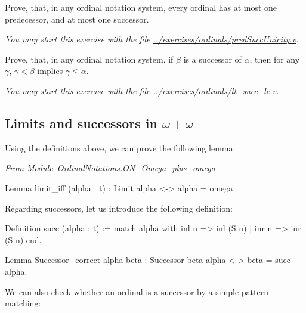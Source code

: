 \begin{exercise}
Prove, that, in any ordinal notation system, every ordinal has at most one predecessor, and at most one successor. 

\emph{You may start this exercise with the file
\url{../exercises/ordinals/predSuccUnicity.v}.}

\end{exercise}

\begin{exercise}
Prove, that, in any ordinal notation system, if $\beta$ is a successor of $\alpha$,
then for any $\gamma$, $\gamma<\beta$ implies 
$\gamma\leq\alpha$.

\emph{You may start this exercise with the file
\url{../exercises/ordinals/lt_succ_le.v}.}
\end{exercise}




\subsection{Limits and successors in \texorpdfstring{$\omega+\omega$}{omega+omega}}

Using the definitions above, we can prove the following lemma:

\vspace{4pt}

\noindent\emph{From Module~\href{../theories/html/hydras.OrdinalNotations.ON_Omega_plus_omega.html}{OrdinalNotations.ON\_Omega\_plus\_omega}}

\begin{Coqsrc}
Lemma limit_iff (alpha : t) : Limit alpha <-> alpha = omega.
\end{Coqsrc}

Regarding successors, let us introduce the following definition:

\begin{Coqsrc}
Definition succ (alpha : t) :=
  match alpha with
    inl n => inl (S n)
  | inr n => inr (S n)
  end.
\end{Coqsrc}


\begin{Coqsrc}
Lemma Successor_correct alpha beta : Successor beta alpha <->
                                     beta = succ alpha.
\end{Coqsrc}

We can also check whether an ordinal is a successor by a simple pattern matching:


